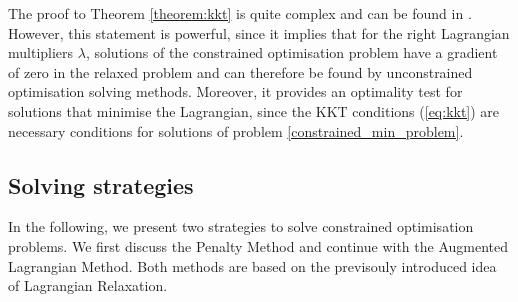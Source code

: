 The proof to Theorem \ref{theorem:kkt} is quite complex and can be found in \cite{NoceWrig06}. However, this statement is powerful, since it implies that for the right Lagrangian multipliers $\lambda$, solutions of the constrained optimisation problem have a gradient of zero in the relaxed problem and can therefore be found by unconstrained optimisation solving methods. Moreover, it provides an optimality test for solutions that minimise the Lagrangian, since the KKT conditions (\ref{eq:kkt}) are necessary conditions for solutions of problem \ref{constrained_min_problem}.\\




\subsection{Solving strategies}
In the following, we present two strategies to solve constrained optimisation problems. We first discuss the Penalty Method and continue with the Augmented Lagrangian Method. Both methods are based on the previsouly introduced idea of Lagrangian Relaxation.

